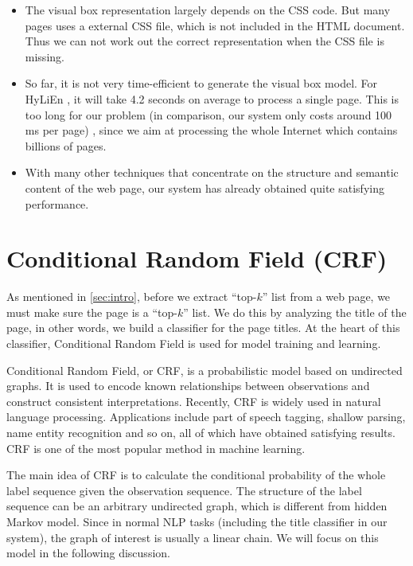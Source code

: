 \begin{itemize}
  \item The visual box representation largely depends on the CSS code.
      But many pages uses a external CSS file, which is not included in the HTML document.
      Thus we can not work out the correct representation when the CSS file is missing.

  \item So far, it is not very time-efficient to generate the visual box model.
  For HyLiEn \cite{FumarolaWBMH11:List}, it will take 4.2 seconds on average to process a single page.
  This is too long for our problem (in comparison, our system only costs around 100 ms per page) ,
  since we aim at processing the whole Internet which contains billions of pages.

  \item With many other techniques that concentrate on the structure and semantic content of the web page,
  our system has already obtained quite satisfying performance.
\end{itemize}

\section{Conditional Random Field (CRF)}

\label{sec:crf}

As mentioned in \ref{sec:intro}, before we extract ``top-$k$'' list from a web page,
we must make sure the page is a ``top-$k$'' list. We do this by analyzing the title of the page,
in other words, we build a classifier for the page titles.
At the heart of this classifier, Conditional Random Field is used for model training and learning.

Conditional Random Field, or CRF\cite{CRFLafferty}, is a probabilistic model based on undirected graphs. It is used to encode known relationships between observations and construct consistent interpretations. Recently, CRF is widely used in natural language processing. Applications include part of speech tagging, shallow parsing, name entity recognition and so on, all of which have obtained satisfying results. CRF is one of the most popular method in machine learning.

The main idea of CRF is to calculate the conditional probability of the whole label sequence given the observation sequence.
The structure of the label sequence can be an arbitrary undirected graph, which is different from hidden Markov model\cite{HMMBaum}.
Since in normal NLP tasks (including the title classifier in our system), the graph of interest is usually a linear chain. We will focus on this model in the following discussion.

